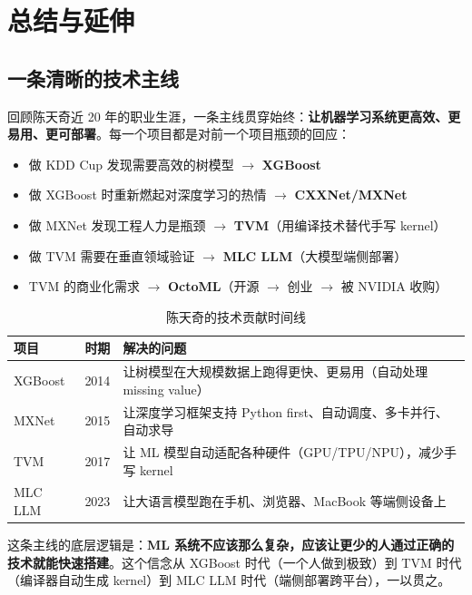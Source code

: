 \section{总结与延伸}

\subsection{一条清晰的技术主线}

回顾陈天奇近 20 年的职业生涯，一条主线贯穿始终：\textbf{让机器学习系统更高效、更易用、更可部署}。每一个项目都是对前一个项目瓶颈的回应：

\begin{itemize}
    \item 做 KDD Cup 发现需要高效的树模型 $\rightarrow$ \textbf{XGBoost}
    \item 做 XGBoost 时重新燃起对深度学习的热情 $\rightarrow$ \textbf{CXXNet/MXNet}
    \item 做 MXNet 发现工程人力是瓶颈 $\rightarrow$ \textbf{TVM}（用编译技术替代手写 kernel）
    \item 做 TVM 需要在垂直领域验证 $\rightarrow$ \textbf{MLC LLM}（大模型端侧部署）
    \item TVM 的商业化需求 $\rightarrow$ \textbf{OctoML}（开源 $\rightarrow$ 创业 $\rightarrow$ 被 NVIDIA 收购）
\end{itemize}

\begin{table}[H]
\centering
\begin{tabular}{p{2.2cm}p{1.8cm}p{9cm}}
\toprule
\textbf{项目} & \textbf{时期} & \textbf{解决的问题} \\
\midrule
XGBoost & 2014 & 让树模型在大规模数据上跑得更快、更易用（自动处理 missing value） \\
MXNet & 2015 & 让深度学习框架支持 Python first、自动调度、多卡并行、自动求导 \\
TVM & 2017 & 让 ML 模型自动适配各种硬件（GPU/TPU/NPU），减少手写 kernel \\
MLC LLM & 2023 & 让大语言模型跑在手机、浏览器、MacBook 等端侧设备上 \\
\bottomrule
\end{tabular}
\caption{陈天奇的技术贡献时间线}
\end{table}

这条主线的底层逻辑是：\textbf{ML 系统不应该那么复杂，应该让更少的人通过正确的技术就能快速搭建}。这个信念从 XGBoost 时代（一个人做到极致）到 TVM 时代（编译器自动生成 kernel）到 MLC LLM 时代（端侧部署跨平台），一以贯之。

